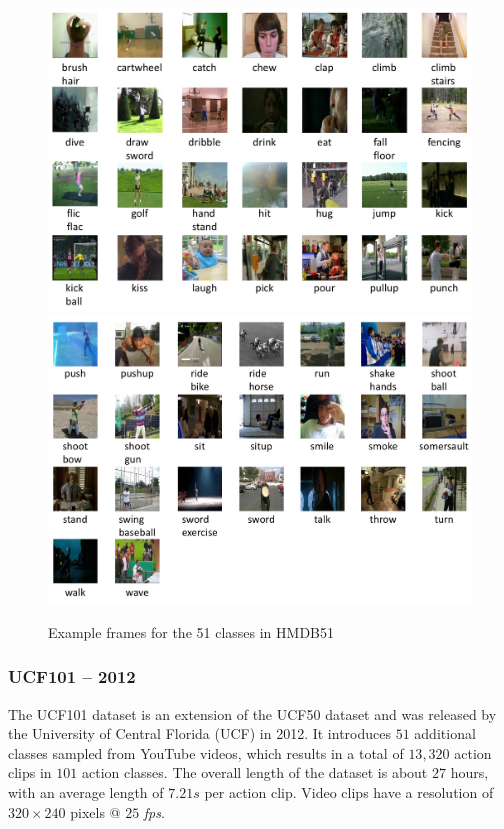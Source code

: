 \begin{figure}[H]
    \centering
    \includegraphics[width=\textwidth]{img_datasets/hmdb_classes1}
    \includegraphics[width=\textwidth]{img_datasets/hmdb_classes2}
    \caption{Example frames for the 51 classes in HMDB51 \cite{_serre_????}}
    \label{fig:hmdb_example}
\end{figure}


\subsubsection{UCF101 -- 2012}
The UCF101 dataset \cite{soomro_ucf101:_2012} is an extension of the UCF50 dataset and was released by the University of Central Florida (UCF) in 2012.
It introduces $51$ additional classes sampled from YouTube videos, which results in a total of $13,320$ action clips in $101$ action classes.
The overall length of the dataset is about $27$ hours, with an average length of $7.21s$ per action clip.
Video clips have a resolution of $320 \times 240$ pixels @ $25$ \textit{fps}. 

